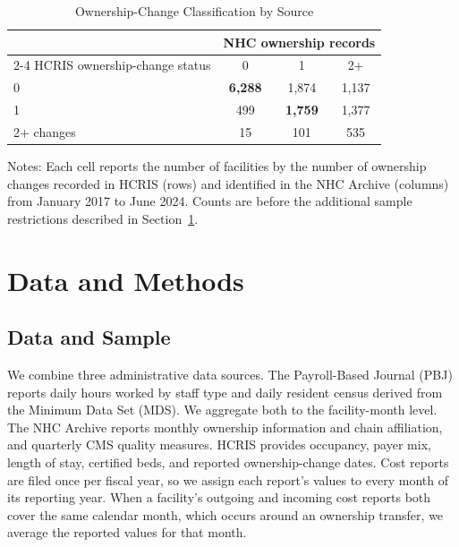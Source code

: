 \documentclass[12pt]{article}
\begin{document}
\begin{table}[!htbp]
\centering
\caption{Ownership-Change Classification by Source}
\label{tab:ownership-classification-sample}

\begin{threeparttable}
\small
\begin{tabularx}{\textwidth}{lccc}
\toprule
& \multicolumn{3}{c}{NHC ownership records} \\
\cmidrule(lr){2-4}
HCRIS ownership-change status 
& 0 
& 1 
& 2+ \\
\midrule
0          & \textbf{6,288} & 1,874 & 1,137 \\
1          & 499 & \textbf{1,759} & 1,377 \\
2+ changes & 15 & 101 & 535 \\
\bottomrule
\end{tabularx}

\begin{tablenotes}
\footnotesize
\item Notes: Each cell reports the number of facilities by the number of ownership changes recorded in HCRIS (rows) and identified in the NHC Archive (columns) from January 2017 to June 2024. Counts are before the additional sample restrictions described in Section~\ref{sec:dataandmethods}.
\end{tablenotes}

\end{threeparttable}
\end{table}

\section{Data and Methods} \label{sec:dataandmethods}

\subsection{Data and Sample} \label{sec:dataandsample}

We combine three administrative data sources. The Payroll-Based Journal (PBJ) reports daily hours worked by staff type and daily resident census derived from the Minimum Data Set (MDS). We aggregate both to the facility-month level. The NHC Archive reports monthly ownership information and chain affiliation, and quarterly CMS quality measures. HCRIS provides occupancy, payer mix, length of stay, certified beds, and reported ownership-change dates. Cost reports are filed once per fiscal year, so we assign each report's values to every month of its reporting year.  When a facility's outgoing and incoming cost reports both cover the same calendar month, which occurs around an ownership transfer, we average the reported values for that month.
\end{document}
